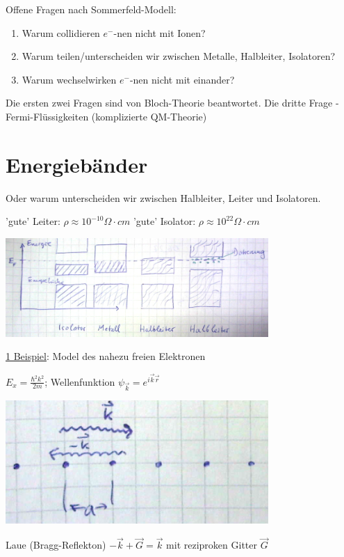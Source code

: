 Offene Fragen nach Sommerfeld-Modell:

\begin{enumerate}
\item Warum collidieren \(e^-\)-nen nicht mit Ionen?
\item Warum teilen/unterscheiden wir zwischen Metalle, Halbleiter, Isolatoren?
\item Warum wechselwirken  \(e^-\)-nen nicht mit einander?
\end{enumerate}

Die ersten zwei Fragen sind von Bloch-Theorie beantwortet. Die dritte Frage - Fermi-Flüssigkeiten (komplizierte QM-Theorie)


\section{Energiebänder}

Oder warum unterscheiden wir zwischen Halbleiter, Leiter und Isolatoren.

'gute' Leiter: \(\rho\approx 10^{-10}\Omega \cdot cm\)
'gute' Isolator:  \(\rho\approx 10^{22}\Omega \cdot cm\)

\includegraphics[width=0.75\textwidth]{kap06_31.png}

\underline{1 Beispiel}: Model des nahezu freien Elektronen

\(E_x=\frac{\hbar^2k^2}{2m}\); Wellenfunktion \(\psi_{\vec k} = e^{i\vec k\vec r}\)

\includegraphics[width=0.75\textwidth]{kap06_32.png}

Laue (Bragg-Reflekton) \(-\vec k+\vec G = \vec k\) mit reziproken Gitter \(\vec G\)

